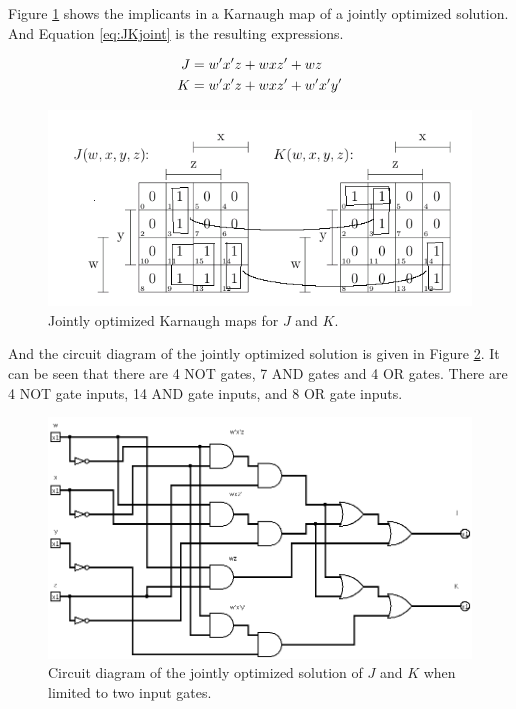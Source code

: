 \documentclass[12pt]{article}
\begin{document}
Figure \ref{fig:JKjointkmap} shows the implicants in a Karnaugh map
of a jointly optimized solution.
And Equation \ref{eq:JKjoint} is the resulting expressions.

\begin{align}
	J &= w'x'z + wxz' + wz  \notag \\
	K &= w'x'z + wxz' + w'x'y'  \label{eq:JKjoint}
\end{align}

\begin{figure}[!htb]
\center
\includegraphics[scale=0.60]{JKkmap-01}
\caption{Jointly optimized Karnaugh maps for $J$ and $K$.}
\label{fig:JKjointkmap}
\end{figure}

And the circuit diagram of the jointly optimized solution is given
in Figure \ref{fig:JKjointcircuit}.
It can be seen that there are 4 NOT gates, 7 AND gates and 4 OR gates.
There are 4 NOT gate inputs, 14 AND gate inputs, and 8 OR gate inputs.

\begin{figure}[!htb]
\center
\includegraphics[scale=0.5]{JKjoint-01}
\caption{Circuit diagram of the jointly optimized solution of $J$ and $K$ when limited to two input gates.}
\label{fig:JKjointcircuit}
\end{figure}
\end{document}
